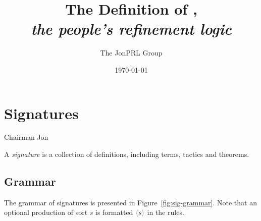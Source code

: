 \documentclass{report}
\title{The Definition of \RedJonPRL{},\\\emph{the people's refinement logic}}
\author{The JonPRL Group}
\date{\today}
\begin{document}
\maketitle
\tableofcontents

\chapter{Signatures}

\epigraph{}{\textsf{Chairman Jon}}

A \emph{signature} is a collection of definitions, including terms, tactics and theorems.

\section{Grammar}
\label{sec:sig-grammar}

The grammar of \RedJonPRL{} signatures is presented in
Figure~\ref{fig:sig-grammar}. Note that an optional production of sort $s$ is
formatted $\Optional{s}$ in the rules.
\end{document}
